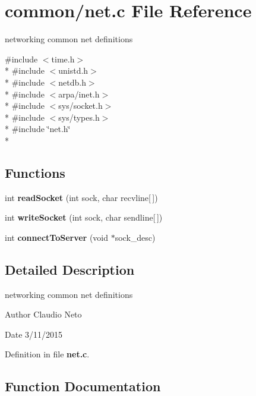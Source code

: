 \section{common/net.c File Reference}
\label{net_8c}


networking common net definitions  


{\ttfamily \#include $<$time.\-h$>$}\\*
{\ttfamily \#include $<$unistd.\-h$>$}\\*
{\ttfamily \#include $<$netdb.\-h$>$}\\*
{\ttfamily \#include $<$arpa/inet.\-h$>$}\\*
{\ttfamily \#include $<$sys/socket.\-h$>$}\\*
{\ttfamily \#include $<$sys/types.\-h$>$}\\*
{\ttfamily \#include \char`\"{}net.\-h\char`\"{}}\\*
\subsection*{Functions}
\begin{DoxyCompactItemize}
\item 
int {\bf read\-Socket} (int sock, char recvline[$\,$])
\item 
int {\bf write\-Socket} (int sock, char sendline[$\,$])
\item 
int {\bf connect\-To\-Server} (void $\ast$sock\-\_\-desc)
\end{DoxyCompactItemize}


\subsection{Detailed Description}
networking common net definitions \begin{DoxyAuthor}{Author}
Claudio Neto
\end{DoxyAuthor}
\begin{DoxyDate}{Date}
3/11/2015 
\end{DoxyDate}


Definition in file {\bf net.\-c}.



\subsection{Function Documentation}
